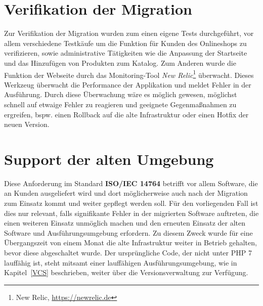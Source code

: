 \section{Verifikation der Migration}\label{newrelic}
Zur Verifikation der Migration wurden zum einen eigene Tests durchgeführt, vor allem verschiedene Testkäufe um die Funktion für Kunden des Onlineshops zu verifizieren, 
sowie administrative Tätigkeiten wie die Anpassung der Startseite und das Hinzufügen von Produkten zum Katalog. Zum Anderen wurde die Funktion der Webseite durch das 
Monitoring-Tool \textit{New Relic}\footnote{New Relic, \url{https://newrelic.de}} überwacht. Dieses Werkzeug überwacht die Performance der Applikation und meldet Fehler 
in der Ausführung. Durch diese Überwachung wäre es möglich gewesen, möglichst schnell auf etwaige Fehler zu reagieren und geeignete 
Gegenmaßnahmen zu ergreifen, bspw. einen Rollback auf die alte Infrastruktur oder einen Hotfix der neuen Version.

\section{Support der alten Umgebung}
Diese Anforderung im Standard \textbf{ISO/IEC 14764} betrifft vor allem Software, die an Kunden ausgeliefert wird und dort möglicherweise auch nach der Migration 
zum Einsatz kommt und weiter gepflegt werden soll. Für den vorliegenden Fall ist dies nur relevant, falls signifikante Fehler in der migrierten Software auftreten, 
die einen weiteren Einsatz unmöglich machen und den erneuten Einsatz der alten Software und Ausführungsumgebung erfordern.
Zu diesem Zweck wurde für eine Übergangszeit von einem Monat die alte Infrastruktur weiter in Betrieb gehalten, bevor diese abgeschaltet wurde. Der ursprüngliche 
Code, der nicht unter \ac{PHP} 7 lauffähig ist, steht mitsamt einer lauffähigen Ausführungsumgebung, wie in Kapitel~\ref{VCS} beschrieben, weiter über die 
Versionsverwaltung zur Verfügung.